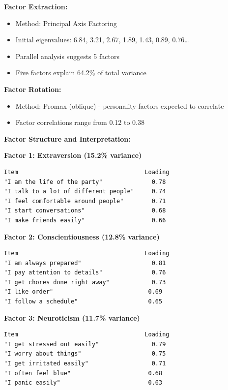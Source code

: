 \documentclass[
]{article}
\begin{document}
\textbf{Factor Extraction:}

\begin{itemize}
\item
  Method: Principal Axis Factoring
\item
  Initial eigenvalues: 6.84, 3.21, 2.67, 1.89, 1.43, 0.89, 0.76\ldots{}
\item
  Parallel analysis suggests 5 factors
\item
  Five factors explain 64.2\% of total variance
\end{itemize}

\textbf{Factor Rotation:}

\begin{itemize}
\item
  Method: Promax (oblique) - personality factors expected to correlate
\item
  Factor correlations range from 0.12 to 0.38
\end{itemize}

\textbf{Factor Structure and Interpretation:}

\textbf{Factor 1: Extraversion (15.2\% variance)}

\begin{verbatim}
Item                                    Loading
"I am the life of the party"              0.78
"I talk to a lot of different people"     0.74
"I feel comfortable around people"        0.71
"I start conversations"                   0.68
"I make friends easily"                   0.66
\end{verbatim}

\textbf{Factor 2: Conscientiousness (12.8\% variance)}

\begin{verbatim}
Item                                    Loading
"I am always prepared"                    0.81
"I pay attention to details"              0.76
"I get chores done right away"            0.73
"I like order"                           0.69
"I follow a schedule"                    0.65
\end{verbatim}

\textbf{Factor 3: Neuroticism (11.7\% variance)}

\begin{verbatim}
Item                                    Loading
"I get stressed out easily"               0.79
"I worry about things"                    0.75
"I get irritated easily"                  0.71
"I often feel blue"                      0.68
"I panic easily"                         0.63
\end{verbatim}
\end{document}
